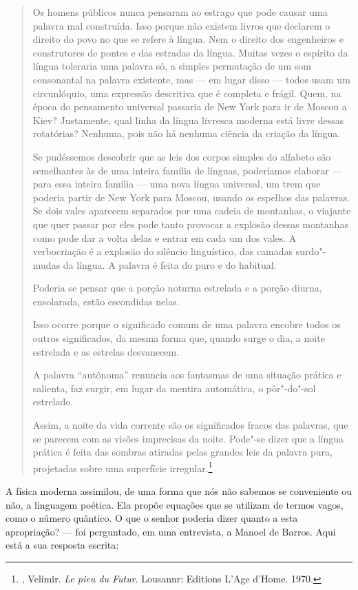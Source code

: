\begin{quote}
Os homens públicos nunca pensaram ao estrago que pode causar uma palavra
mal construída. Isso porque não existem livros que declarem o direito do
povo no que se refere à língua. Nem o direito dos engenheiros e
construtores de pontes e das estradas da língua. Muitas vezes o espírito
da língua toleraria uma palavra só, a simples permutação de um som
consonantal na palavra existente, mas --- em lugar disso --- todos usam um
circunlóquio, uma expressão descritiva que é completa e frágil. Quem, na
época do pensamento universal passaria de New York para ir de Moscou a
Kiev? Justamente, qual linha da língua livresca moderna está livre
dessas rotatórias? Nenhuma, pois não há nenhuma ciência da criação da
língua.

Se pudéssemos descobrir que as leis dos corpos simples do alfabeto são
semelhantes às de uma inteira família de línguas, poderíamos elaborar ---
para essa inteira família --- uma nova língua universal, um trem que
poderia partir de New York para Moscou, usando os espelhos das palavras.
Se dois vales aparecem separados por uma cadeia de montanhas, o viajante
que quer passar por eles pode tanto provocar a explosão dessas montanhas
como pode dar a volta delas e entrar em cada um dos vales. A
verbocriação é a explosão do silêncio linguístico, das camadas
surdo"-mudas da língua. A palavra é feita do puro e do habitual.

Poderia se pensar que a porção noturna estrelada e a porção diurna,
ensolarada, estão escondidas nelas.

Isso ocorre porque o significado comum de uma palavra encobre todos os
outros significados, da mesma forma que, quando surge o dia, a noite
estrelada e as estrelas desvanecem.

A palavra ``autônoma'' renuncia aos fantasmas de uma situação prática e
salienta, faz surgir, em lugar da mentira automática, o pôr"-do"-sol
estrelado.

Assim, a noite da vida corrente são os significados fracos das palavras,
que se parecem com as visões imprecisas da noite. Pode"-se dizer que a
língua prática é feita das sombras atiradas pelas grandes leis da
palavra pura, projetadas sobre uma superfície irregular.\footnote{,
  Velímir. \emph{Le pieu du Futur}. Lousannr: Editions L'Age d'Home.
  1970.}
\end{quote}

A física moderna assimilou, de uma forma que nós não sabemos se
conveniente ou não, a linguagem poética. Ela propõe equações que se
utilizam de termos vagos, como o número quântico. O que o senhor poderia
dizer quanto a esta apropriação? --- foi perguntado, em uma entrevista, a
Manoel de Barros. Aqui está a sua resposta escrita:

